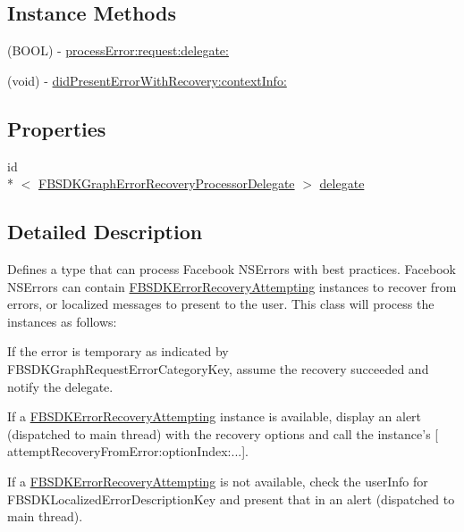 \subsection*{Instance Methods}
\begin{DoxyCompactItemize}
\item 
(B\-O\-O\-L) -\/ \hyperlink{interface_f_b_s_d_k_graph_error_recovery_processor_a0073720d8165a9ec12647d370248e343}{process\-Error\-:request\-:delegate\-:}
\item 
(void) -\/ \hyperlink{interface_f_b_s_d_k_graph_error_recovery_processor_a2b4fe67a50c150f8b5fc0e664d92c552}{did\-Present\-Error\-With\-Recovery\-:context\-Info\-:}
\end{DoxyCompactItemize}
\subsection*{Properties}
\begin{DoxyCompactItemize}
\item 
id\\*
$<$ \hyperlink{protocol_f_b_s_d_k_graph_error_recovery_processor_delegate-p}{F\-B\-S\-D\-K\-Graph\-Error\-Recovery\-Processor\-Delegate} $>$ \hyperlink{interface_f_b_s_d_k_graph_error_recovery_processor_a3028da88a3e241fed8b263d99c207092}{delegate}
\end{DoxyCompactItemize}


\subsection{Detailed Description}
Defines a type that can process Facebook N\-S\-Errors with best practices.  Facebook N\-S\-Errors can contain \hyperlink{protocol_f_b_s_d_k_error_recovery_attempting-p}{F\-B\-S\-D\-K\-Error\-Recovery\-Attempting} instances to recover from errors, or localized messages to present to the user. This class will process the instances as follows\-:


\begin{DoxyEnumerate}
\item If the error is temporary as indicated by F\-B\-S\-D\-K\-Graph\-Request\-Error\-Category\-Key, assume the recovery succeeded and notify the delegate.
\item If a \hyperlink{protocol_f_b_s_d_k_error_recovery_attempting-p}{F\-B\-S\-D\-K\-Error\-Recovery\-Attempting} instance is available, display an alert (dispatched to main thread) with the recovery options and call the instance's \mbox{[} attempt\-Recovery\-From\-Error\-:option\-Index\-:...\mbox{]}.
\item If a \hyperlink{protocol_f_b_s_d_k_error_recovery_attempting-p}{F\-B\-S\-D\-K\-Error\-Recovery\-Attempting} is not available, check the user\-Info for F\-B\-S\-D\-K\-Localized\-Error\-Description\-Key and present that in an alert (dispatched to main thread).
\end{DoxyEnumerate}

